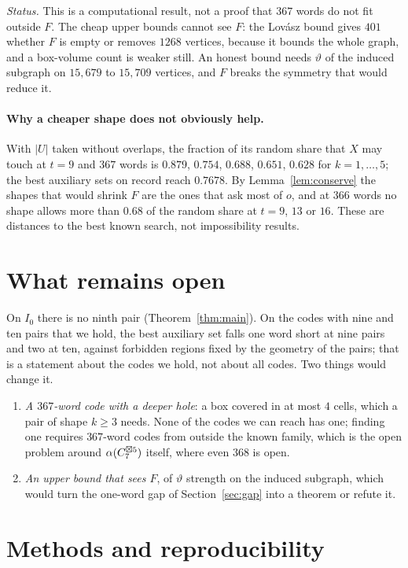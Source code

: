 \emph{Status.} This is a computational result, not a proof that $367$ words do not fit outside $F$.
The cheap upper bounds cannot see $F$: the Lov\'asz bound gives $401$ whether $F$ is empty or removes
$1268$ vertices, because it bounds the whole graph, and a box-volume count is weaker still. An honest
bound needs $\vartheta$ of the induced subgraph on $15{,}679$ to $15{,}709$ vertices, and $F$ breaks the
symmetry that would reduce it.

\paragraph{Why a cheaper shape does not obviously help.} With $|U|$ taken without overlaps, the
fraction of its random share that $X$ may touch at $t=9$ and $367$ words is $0.879$, $0.754$, $0.688$,
$0.651$, $0.628$ for $k=1,\dots,5$; the best auxiliary sets on record reach $0.7678$. By
Lemma~\ref{lem:conserve} the shapes that would shrink $F$ are the ones that ask most of $o$, and at
$366$ words no shape allows more than $0.68$ of the random share at $t=9$, $13$ or $16$. These are
distances to the best known search, not impossibility results.

\section{What remains open}
\label{sec:open}

On $I_0$ there is no ninth pair (Theorem~\ref{thm:main}). On the codes with nine and ten pairs that we
hold, the best auxiliary set falls one word short at nine pairs and two at ten, against forbidden
regions fixed by the geometry of the pairs; that is a statement about the codes we hold, not about all
codes. Two things would change it.

\begin{enumerate}
\item \emph{A $367$-word code with a deeper hole}: a box covered in at most $4$ cells, which a pair of
shape $k\ge3$ needs. None of the codes we can reach has one; finding one requires $367$-word codes from
outside the known family, which is the open problem around $\alpha(C_7^{\boxtimes 5})$ itself, where even
$368$ is open.
\item \emph{An upper bound that sees $F$}, of $\vartheta$ strength on the induced subgraph, which would
turn the one-word gap of Section~\ref{sec:gap} into a theorem or refute it.
\end{enumerate}

\section{Methods and reproducibility}
\label{sec:repro}

